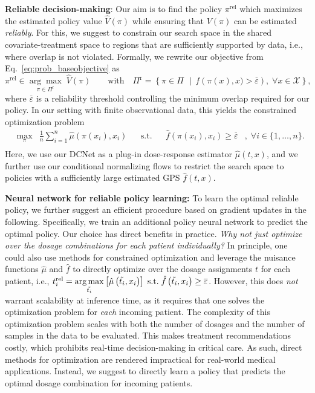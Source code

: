 \documentclass{article}
\theoremstyle{definition}
\theoremstyle{plain}
\begin{document}
\textbf{Reliable decision-making}: Our aim is to find the policy $\pi^\text{rel}$ which maximizes the estimated policy value $\hat{V}(\pi)$ while ensuring that $V(\pi)$ can be estimated \emph{reliably}. For this, we suggest to constrain our search space in the shared covariate-treatment space to regions that are sufficiently supported by data, i.e., where overlap is not violated. Formally, we rewrite our objective from Eq.~\eqref{eq:prob_baseobjective} as
\begin{equation}
    \pi^\text{rel} \in \underset{\pi \in \Pi^{\mathrm{r}}}{\arg\max} \; \hat{V}(\pi) 
    \qquad\text{with} \quad
    \Pi^{\mathrm{r}} = \left\{ \pi \in \Pi\ \,\mid\, f \left(\pi(x), x) > \overline{\varepsilon} \right), \; \forall x \in \mathcal{X} \right\} ,
\end{equation}
where $\overline{\varepsilon}$ is a reliability threshold controlling the minimum overlap required for our policy.
In our setting with finite observational data, this yields the constrained optimization problem 
\begin{equation}
\label{eq:method_constrainedobjective}
    \begin{aligned}
         & \underset{\pi}{\max} & \frac{1}{n}\sum_{i=1}^{n} \hat{\mu} \left( \pi(x_i), x_i \right) & &
         \text{s.t.}  & & \hat{f} \left( \pi(x_i), x_i \right) \geq \overline{\varepsilon} & ,\; \forall i \in \{1, \ldots, n\}. \\
    \end{aligned}
\end{equation}
 Here, we use our DCNet as a plug-in dose-response estimator $\hat{\mu}(t, x)$, and we further use our conditional normalizing flows to restrict the search space to policies with a sufficiently large estimated GPS $\hat{f}(t, x)$. 

\textbf{Neural network for reliable policy learning:} To learn the optimal reliable policy, we further suggest an efficient procedure based on gradient updates in the following. Specifically, we train an additional policy neural network to predict the optimal policy. Our choice has direct benefits in practice. \emph{Why not just optimize over the dosage combinations for each patient individually?} In principle, one could also use methods for constrained optimization and leverage the nuisance functions $\hat{\mu}$ and $\hat{f}$ to directly optimize over the dosage assignments $t$ for each patient, i.e., 
$ t_i^{\mathrm{rel}} = \underset{\Tilde{t_i}}{{\arg\max}}\left[ \hat{\mu} \left( \Tilde{t_i}, x_i \right) \right] \;
\text{s.t.}\; \hat{f} \left( \Tilde{t_i}, x_i \right) \geq \overline{\varepsilon}$.
However, this does \emph{not} warrant scalability at inference time, as it requires that one solves the optimization problem for \emph{each} incoming patient. The complexity of this optimization problem scales with both the number of dosages and the number of samples in the data to be evaluated. This makes treatment recommendations costly, which prohibits real-time decision-making in critical care. As such, direct methods for optimization are rendered impractical for real-world medical applications. Instead, we suggest to directly learn a policy that predicts the optimal dosage combination for incoming patients. 
\end{document}
